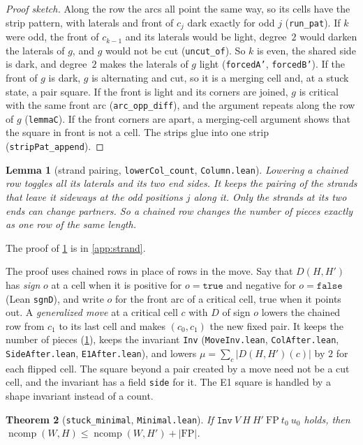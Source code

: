 \documentclass[11pt]{article}
\theoremstyle{plain}
\newtheorem{theorem}{Theorem}[section]
\newtheorem{lemma}[theorem]{Lemma}
\theoremstyle{definition}
\theoremstyle{remark}
\newcommand{\lean}[1]{\texttt{#1}}
\newcommand{\ncomp}{\operatorname{ncomp}}
\begin{document}
\begin{proof}[Proof sketch]
Along the row the arcs all point the same way, so its cells have the strip pattern, with laterals
and front of $c_j$ dark exactly for odd $j$ (\lean{run\_pat}).
If $k$ were odd, the front of $c_{k-1}$ and its laterals would be light, degree~$2$ would darken the
laterals of $g$, and $g$ would not be cut (\lean{uncut\_of}).
So $k$ is even, the shared side is dark, and degree~$2$ makes the laterals of $g$ light
(\lean{forcedA'}, \lean{forcedB'}).
If the front of $g$ is dark, $g$ is alternating and cut, so it is a merging cell and, at a stuck
state, a pair square.
If the front is light and its corners are joined, $g$ is critical with the same front arc
(\lean{arc\_opp\_diff}), and the argument repeats along the row of $g$ (\lean{lemmaC}).
If the front corners are apart, a merging-cell argument shows that the square in front is not a
cell.
The strips glue into one strip (\lean{stripPat\_append}).
\end{proof}

\begin{lemma}[strand pairing, \lean{lowerCol\_count}, \lean{Column.lean}]
\label{lem:strand}
Lowering a chained row toggles all its laterals and its two end sides.
It keeps the pairing of the strands that leave it sideways at the odd positions $j$ along it.
Only the strands at its two ends can change partners.
So a chained row changes the number of pieces exactly as one row of the same length.
\end{lemma}

The proof of \cref{lem:strand} is in \cref{app:strand}.

The proof uses chained rows in place of rows in the move.
Say that $D(H,H')$ has \emph{sign} $o$ at a cell when it is positive for $o=\lean{true}$ and negative
for $o=\lean{false}$ (Lean \lean{sgnD}), and write $o$ for the front arc of a critical cell, true when
it points out.
A \emph{generalized move} at a critical cell $c$ with $D$ of sign $o$ lowers the chained row from
$c_1$ to its last cell and makes $(c_0,c_1)$ the new fixed pair.
It keeps the number of pieces (\cref{lem:strand}), keeps the invariant \lean{Inv}
(\lean{MoveInv.lean}, \lean{ColAfter.lean}, \lean{SideAfter.lean}, \lean{E1After.lean}), and lowers
$\mu=\sum_c|D(H,H')(c)|$ by $2$ for each flipped cell.
The square beyond a pair created by a move need not be a cut cell, and the invariant has a field
\lean{side} for it.
The E1 square is handled by a shape invariant instead of a count.

\begin{theorem}[\lean{stuck\_minimal}, \lean{Minimal.lean}]
\label{thm:minimal}
If $\lean{Inv}\ V\ H\ H'\ \mathrm{FP}\ t_0\ u_0$ holds, then
$\ncomp(W,H)\le\ncomp(W,H')+|\mathrm{FP}|$.
\end{theorem}
\end{document}
